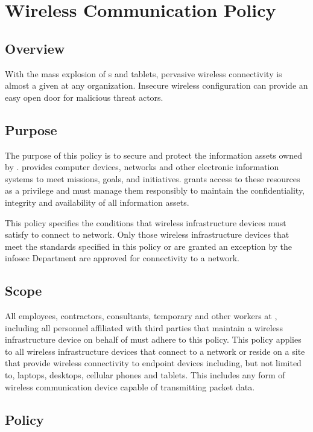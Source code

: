 \chapter{Wireless Communication Policy}
\CommonIntroduction
\section{Overview}
With the mass explosion of \smartphone{}s and tablets, pervasive wireless connectivity is almost a given at any organization.  
Insecure wireless configuration can provide an easy open door for malicious threat actors. 
\section{Purpose}
The purpose of this policy is to secure and protect the information assets owned by \CompanyName{}.  
\CompanyName{} provides computer devices, networks\oxford{} and other electronic information systems to meet missions, goals, and initiatives.  
\CompanyName{} grants access to these resources as a privilege and must manage them responsibly to maintain the confidentiality, integrity\oxford{} and availability of all information assets.

This policy specifies the conditions that wireless infrastructure devices must satisfy to connect to \CompanyName{} network.  
Only those wireless infrastructure devices that meet the standards specified in this policy or are granted an exception by the \gls{infosec} Department are approved for connectivity to a \CompanyName{} network.
\section{Scope}
All employees, contractors, consultants, temporary\oxford{} and other workers at \CompanyName{}, including all personnel affiliated with third parties that maintain a wireless infrastructure device on behalf of \CompanyName{} must adhere to this policy.  
This policy applies to all wireless infrastructure devices that connect to a \CompanyName{} network or reside on a \CompanyName{} site that provide wireless connectivity to endpoint devices including, but not limited to, laptops, desktops, cellular phones\oxford{} and tablets.  
This includes any form of wireless communication device capable of transmitting packet data. 
\section{Policy}
